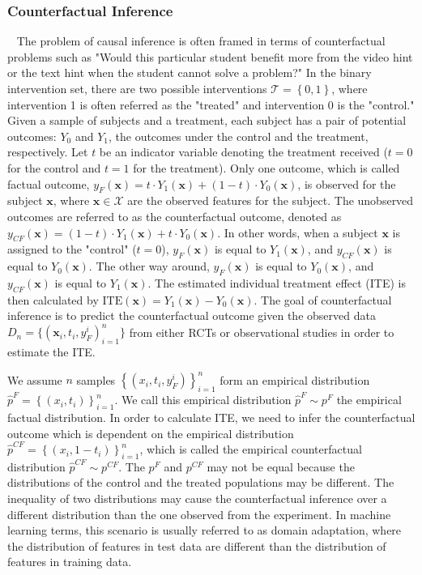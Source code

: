 \documentclass{article}
\begin{document}
\subsubsection{Counterfactual Inference}~\label{sect:bnn}
The problem of causal inference is often framed in terms of
counterfactual problems such as "Would this particular student benefit
more from the video hint or the text hint when the student cannot
solve a problem?" In the binary intervention set, there are two possible interventions
$\mathcal{T} = \left \{  0, 1 \right \}$, where intervention 1 is
often referred as the "treated" and intervention 0 is the "control."
Given a sample of subjects and a treatment, each subject has a pair of
potential outcomes: $Y_0$ and $Y_1$, the outcomes under the
control and the treatment, respectively. Let $t$ be an indicator
variable denoting the treatment received ($t = 0$ for the control and
$t=1$ for the treatment). Only one outcome, which is called factual
outcome, $y_F(\mathbf{x}) =t\cdot Y_1(\mathbf{x}) +
(1-t) \cdot Y_0(\mathbf{x})$, is observed for the
subject $\mathbf{x}$, where
$\mathbf{x} \in \mathcal{X}$ are the
observed features for the subject. The unobserved outcomes are referred to as the
counterfactual outcome, denoted as $y_{CF}(\mathbf{x}) = (1-t)\cdot Y_1(\mathbf{x}) +
t \cdot Y_0(\mathbf{x})$. In other words, when a subject $\mathbf{x}$ is assigned to the
"control" ($t = 0$), $y_F(\mathbf{x})$ is equal to $Y_1(\mathbf{x})$, and $y_{CF}(\mathbf{x})$ is
equal to $Y_0(\mathbf{x})$. The other way around, $y_F(\mathbf{x})$ is equal to
$Y_0(\mathbf{x})$, and $y_{CF}(\mathbf{x})$ is equal to $Y_1(\mathbf{x})$. The estimated
individual treatment effect (ITE) is then calculated by
$\mathrm{ITE}(\mathbf{x})=Y_1(\mathbf{x}) - Y_0(\mathbf{x})$. The goal
of counterfactual inference is to predict the counterfactual outcome
given the observed data $D_n=\{(\mathbf{x}_i,t_i,y_F^i)_{i=1}^n\}$ from either RCTs or observational studies in
order to estimate the ITE.

We assume $n$ samples $\left \{ (x_i, t_i, y_F^i) \right \}_{i=1}^n$
form an empirical distribution $\hat{p}^F  = \left \{ (x_i, t_i)
\right \}_{i=1}^n$. We call this empirical distribution $\hat{p}^F
\sim p^F$ the empirical factual distribution. In order to calculate
ITE, we need to infer the counterfactual outcome which is dependent on
the empirical distribution $\hat{p}^{CF}  = \left \{ (x_i, 1-t_i)
\right \}_{i=1}^n$, which is called the empirical counterfactual distribution $\hat{p}^{CF}
\sim p^{CF}$. The $p^{F}$ and $p^{CF}$ may not be equal because the
distributions of the control and the treated populations may be
different. The inequality of two distributions may cause the
counterfactual inference over a different distribution than the one
observed from the experiment. In machine learning terms, this scenario
is usually referred to as domain adaptation, where the distribution of
features in test data are different than the distribution of features
in training data.
\end{document}

